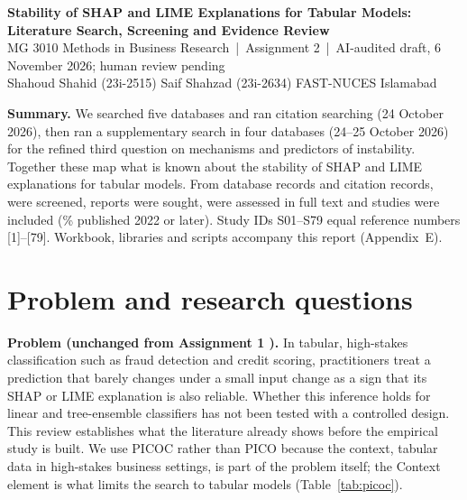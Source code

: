 


\nocite{S01,S02,S03,S04,S05,S06,S07,S08,S09,S10,S11,S12,S13,S14,S15,S16,S17,S18,S19,S20,S21,S22,S23,S24,S25,S26,S27,S28,S29,S30,S31,S32,S33,S34,S35,S36,S37,S38,S39,S40,S41,S42,S43,S44,S45,S46,S47,S48,S49,S50,S51,S52,S53,S54,S55,S56,S57,S58,S59,S60,S61,S62,S63,S64,S65,S66,S67,S68,S69,S70,S71,S72,S73,S74,S75,S76,S77,S78,S79}

\begin{center}
{\Large\bfseries\color{navy} Stability of SHAP and LIME Explanations for Tabular Models:\\[2pt] Literature Search, Screening and Evidence Review}\\[6pt]
{\small MG 3010 Methods in Business Research \,|\, Assignment 2 \,|\, AI-audited draft, 6 November 2026; human review pending}\\[3pt]
{\small Shahoud Shahid (23i-2515) \quad Saif Shahzad (23i-2634) \quad FAST-NUCES Islamabad}
\end{center}
\vspace{-4pt}
{\small\noindent\textbf{Summary.} We searched five databases and ran citation searching (24 October 2026), then ran a supplementary search in four databases (24--25 October 2026) for the refined third question on mechanisms and predictors of instability. Together these map what is known about the stability of SHAP and LIME explanations for tabular models. From \dbAllId{} database records and \csHarvested{} citation records, \totalScreened{} were screened, \totalSought{} reports were sought, \totalAssessed{} were assessed in full text and \totalIncluded{} studies were included (\pctSinceTwentyTwo\% published 2022 or later). Study IDs S01--S79 equal reference numbers [1]--[79]. Workbook, libraries and scripts accompany this report (Appendix~E).}

\section{Problem and research questions}
\textbf{Problem (unchanged from Assignment 1 \cite{a1proposal}).} In tabular, high-stakes classification such as fraud detection and credit scoring, practitioners treat a prediction that barely changes under a small input change as a sign that its SHAP \cite{lundberg2017} or LIME \cite{ribeiro2016} explanation is also reliable. Whether this inference holds for linear and tree-ensemble classifiers has not been tested with a controlled design. This review establishes what the literature already shows before the empirical study is built. We use PICOC rather than PICO because the context, tabular data in high-stakes business settings, is part of the problem itself; the Context element is what limits the search to tabular models (Table~\ref{tab:picoc}).

